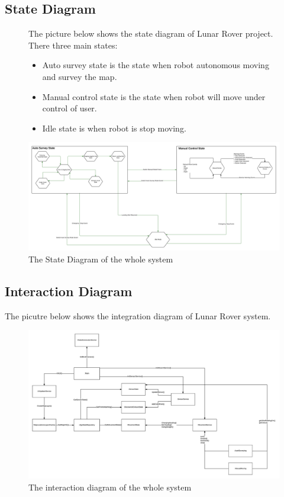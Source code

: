\subsection{State Diagram}
\begin{figure}[H]
	The picture below shows the state diagram of Lunar Rover project. There three main states:
	\begin{itemize}
		\item Auto survey state is the state when robot autonomous moving and survey the map.
		\item Manual control state is the state when robot will move under control of user.
		\item Idle state is when robot is stop moving.
	\end{itemize}
	\centering
	\hspace*{-15mm}
	\includegraphics[width=1.2\textwidth]{StateDiagram.png}	
	\caption{\label{fig:diagramState}The State Diagram of the whole system}
\end{figure}	

\subsection{Interaction Diagram}
The picutre below shows the integration diagram of Lunar Rover system.
\begin{figure}[H]
	\centering
	\hspace*{-25mm}
	\includegraphics[width=1.4\textwidth]{InteractionDiagram.png}	
	\caption{\label{fig:diagramInteraction}The interaction diagram of the whole system}
\end{figure}	